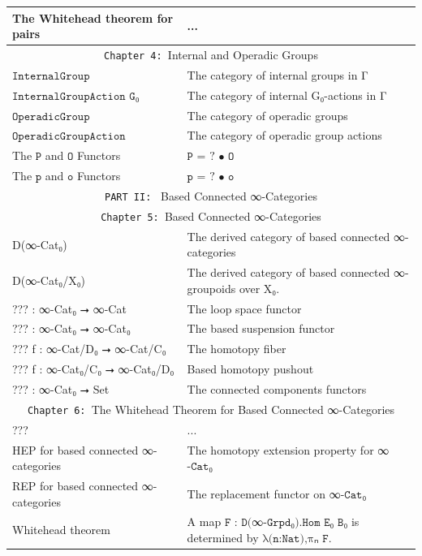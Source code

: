 \documentclass{book}
\theoremstyle{definition}
\begin{document}
{\begin{longtable}{|| l || l ||}
\hline
The Whitehead theorem for pairs & ... \\
\hline \hline
 \multicolumn{2}{||c||}{\texttt{Chapter 4: }Internal and Operadic Groups} \\
\hline \hline
 $\texttt{InternalGroup}$   & The category of internal groups in Γ  \\
 \hline
 $\texttt{InternalGroupAction G₀}$ & The category of internal G₀-actions in Γ   \\
 \hline
  $\texttt{OperadicGroup}$  & The category of operadic groups  \\
 \hline
 $\texttt{OperadicGroupAction}$  & The category of operadic group actions  \\
 \hline
  The $\texttt{P}$ and $\texttt{O}$ Functors & $\texttt{P = ? • O}$ \\
 \hline
 The $\texttt{p}$ and $\texttt{o}$ Functors & $\texttt{p = ? • o}$ \\
 \hline
\hline \hline
\multicolumn{2}{||c||}{\texttt{PART II: } Based Connected ∞-Categories} \\
\hline \hline
\multicolumn{2}{||c||}{\texttt{Chapter 5: }Based Connected ∞-Categories} \\
\hline \hline
D(∞-Cat₀) & The derived category of based connected ∞-categories \\
\hline
D(∞-Cat₀/X₀) & The derived category of based connected ∞-groupoids over X₀. \\
\hline
??? : ∞-Cat₀ ⭢ ∞-Cat & The loop space functor \\
\hline
??? : ∞-Cat₀ ⭢ ∞-Cat₀ & The based suspension functor \\
\hline 
??? f : ∞-Cat/D₀ ⭢ ∞-Cat/C₀ & The homotopy fiber\\
\hline 
??? f : ∞-Cat₀/C₀ ⭢ ∞-Cat₀/D₀ & Based homotopy pushout \\
 \hline 
??? : ∞-Cat₀ ⭢ Set & The connected components functors\\
 \hline \hline
  \multicolumn{2}{||c||}{\texttt{Chapter 6: }The Whitehead Theorem for Based Connected ∞-Categories} \\
\hline \hline
??? & ...\\
\hline
HEP for based connected ∞-categories & The homotopy extension property for ∞$\texttt{-Cat}$₀\\
\hline
REP for based connected ∞-categories & The replacement functor on ∞$\texttt{-Cat}$₀ \\
 \hline 
Whitehead theorem & A map $\texttt{F : D(}$∞$\texttt{-Grpd₀).Hom E₀ B₀}$ is determined by $\texttt{λ(n:Nat),πₙ F}$. \\

\end{longtable}}
\end{document}
